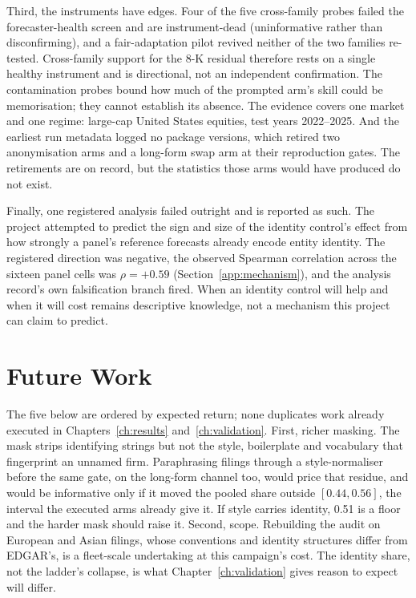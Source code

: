 Third, the instruments have edges. Four of the five cross-family probes failed the forecaster-health screen and are instrument-dead (uninformative rather than disconfirming), and a fair-adaptation pilot revived neither of the two families re-tested. Cross-family support for the 8-K residual therefore rests on a single healthy instrument and is directional, not an independent confirmation. %
The contamination probes bound how much of the prompted arm's skill could be memorisation; they cannot establish its absence. %
The evidence covers one market and one regime: large-cap United States equities, test years 2022--2025. %
And the earliest run metadata logged no package versions, which retired two anonymisation arms and a long-form swap arm at their reproduction gates. The retirements are on record, but the statistics those arms would have produced do not exist. %

Finally, one registered analysis failed outright and is reported as such. The project attempted to predict the sign and size of the identity control's effect from how strongly a panel's reference forecasts already encode entity identity. The registered direction was negative, the observed Spearman correlation across the sixteen panel cells was $\rho=+0.59$ (Section~\ref{app:mechanism}), and the analysis record's own falsification branch fired. %
When an identity control will help and when it will cost remains descriptive knowledge, not a mechanism this project can claim to predict.

\section{Future Work}
\label{sec:conc-future}

The five below are ordered by expected return; none duplicates work already executed in Chapters~\ref{ch:results} and~\ref{ch:validation}. First, richer masking. The mask strips identifying strings but not the style, boilerplate and vocabulary that fingerprint an unnamed firm. Paraphrasing filings through a style-normaliser before the same gate, on the long-form channel too, would price that residue, and would be informative only if it moved the pooled share outside $[0.44, 0.56]$, the interval the executed arms already give it. If style carries identity, 0.51 is a floor and the harder mask should raise it. %
Second, scope. Rebuilding the audit on European and Asian filings, whose conventions and identity structures differ from EDGAR's, is a fleet-scale undertaking at this campaign's cost. %
The identity share, not the ladder's collapse, is what Chapter~\ref{ch:validation} gives reason to expect will differ.


